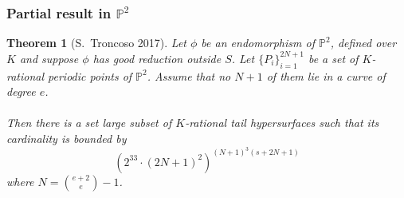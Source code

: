 \documentclass{beamer}
\def\jump{ \quad \\ \vspace{0.5cm} \pause}
\def\PP{{\mathbb P}}
\theoremstyle{thmstyle}
\newtheorem*{mythm}{Theorem}
\theoremstyle{mystyle}
\theoremstyle{qstnstyle}
\begin{document}
\begin{frame}
\frametitle{Partial result in $\PP^2$}

\begin{mythm}[S.\ Troncoso 2017]
Let $\phi$ be an endomorphism of $\PP^2$, defined over $K$ and suppose $\phi$ has good reduction outside $S$. Let $\{P_i\}_{i=1}^{2N+1} $ be a set of $K$-rational periodic points of $\PP^2$. Assume that no $N+1$ of them lie in a curve of degree $e$.\\ \jump Then there is a set \textit{large subset} of $K$-rational tail hypersurfaces such that its cardinality is bounded by
 $$ \left(2^{33} \cdot (2N+1)^2\right)^{\left(N+1\right)^3(s+2N+1)}  $$
where $N=\binom{e+2}{e}-1$.

\end{mythm}
\end{frame}

%
%
%
%
\end{document}
